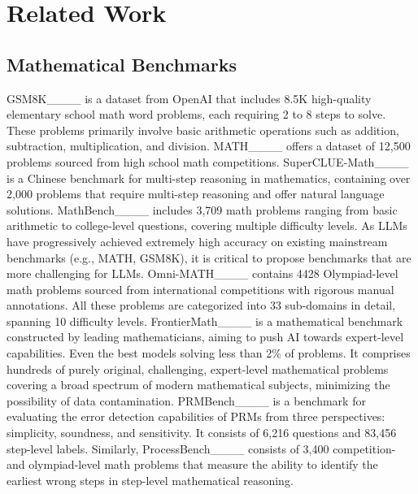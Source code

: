 \section{Related Work}
\subsection{Mathematical Benchmarks}
GSM8K____ is a dataset from OpenAI that includes 8.5K high-quality elementary school math word problems, each requiring 2 to 8 steps to solve. These problems primarily involve basic arithmetic operations such as addition, subtraction, multiplication, and division. MATH____ offers a dataset of 12,500 problems sourced from high school math competitions. SuperCLUE-Math____ is a Chinese benchmark for multi-step reasoning in mathematics, containing over 2,000 problems that require multi-step reasoning and offer natural language solutions. MathBench____ includes 3,709 math problems ranging from basic arithmetic to college-level questions, covering multiple difficulty levels. As LLMs have progressively achieved extremely high accuracy on existing mainstream benchmarks (e.g., MATH, GSM8K), it is critical to propose benchmarks that are more challenging for LLMs. Omni-MATH____ contains 4428 Olympiad-level math problems sourced from international competitions with rigorous manual annotations. All these problems are categorized into 33 sub-domains in detail, spanning 10 difficulty levels. FrontierMath____ is a mathematical benchmark constructed by leading mathematicians, aiming to push AI towards expert-level capabilities. Even the best models solving less than 2\% of problems. It comprises hundreds of purely original, challenging, expert-level mathematical problems covering a broad spectrum of modern mathematical subjects, minimizing the possibility of data contamination. PRMBench____ is a benchmark for evaluating the error detection capabilities of PRMs from three perspectives: simplicity, soundness, and sensitivity. It consists of 6,216 questions and 83,456 step-level labels. Similarly, ProcessBench____ consists of 3,400 competition- and olympiad-level math problems that measure the ability to identify the earliest wrong steps in step-level mathematical reasoning. 
